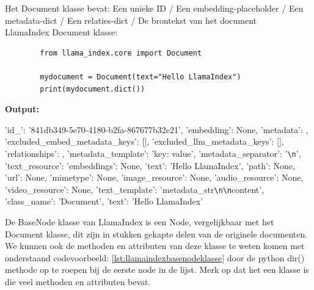 
Het Document klasse bevat: Een unieke ID / Een embedding-placeholder / Een metadata-dict / Een relaties-dict / De brontekst van het document \\

LlamaIndex Document klasse:
\begin{listing}
    \begin{verbatim}
        from llama_index.core import Document
        
        mydocument = Document(text="Hello LlamaIndex")
        print(mydocument.dict())
    \end{verbatim}
    \caption[LlamaIndex Document klasse]{LlamaIndex Document klasse.}
    \label{lst:llamaindexdocumentklasse}
\end{listing}

\textbf{Output:}
\begin{tcolorbox}[colback=gray!20, colframe=gray!80]
    {'id\_': '841db349-5e70-4180-b2fa-867677b32e21', 'embedding': None, 'metadata': {}, 'excluded\_embed\_metadata\_keys': [], 'excluded\_llm\_metadata\_keys': [], 'relationships': {}, 'metadata\_template': '{key}: {value}', 'metadata\_separator': '\verb|\n|', 'text\_resource': {'embeddings': None, 'text': 'Hello LlamaIndex', 'path': None, 'url': None, 'mimetype': None}, 'image\_resource': None, 'audio\_resource': None, 'video\_resource': None, 'text\_template': '{metadata\_str}\verb|\n\n|{content}', 'class\_name': 'Document', 'text': 'Hello LlamaIndex'}
\end{tcolorbox}

De BaseNode klasse van LlamaIndex is een Node, vergelijkbaar met het Document klasse, dit zijn in stukken gekapte delen van de originele documenten. We kunnen ook de methoden en attributen van deze klasse te weten komen met onderstaand codevoorbeeld: \ref{lst:llamaindexbasenodeklasse} door de python dir() methode op te roepen bij de eerste node in de lijst. Merk op dat het een klasse is die veel methoden en attributen bevat.


